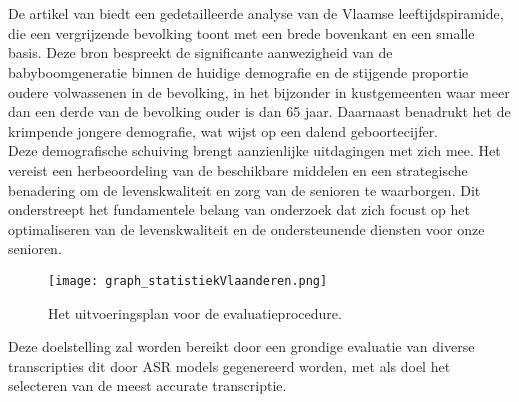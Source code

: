
\chapter{}%
\label{ch:inleiding}


De artikel van \textcite{StatistiekVlaanderen2023} biedt een gedetailleerde analyse van de Vlaamse leeftijdspiramide, die een vergrijzende bevolking toont met een brede bovenkant en een smalle basis. Deze bron bespreekt de significante aanwezigheid van de babyboomgeneratie binnen de huidige demografie en de stijgende proportie oudere volwassenen in de bevolking, in het bijzonder in kustgemeenten waar meer dan een derde van de bevolking ouder is dan 65 jaar. Daarnaast benadrukt het de krimpende jongere demografie, wat wijst op een dalend geboortecijfer. 
\\
Deze demografische schuiving brengt aanzienlijke uitdagingen met zich mee. Het vereist een herbeoordeling van de beschikbare middelen en een strategische benadering om de levenskwaliteit en zorg van de senioren te waarborgen. Dit onderstreept het fundamentele belang van onderzoek dat zich focust op het optimaliseren van de levenskwaliteit en de ondersteunende diensten voor onze senioren.
\begin{figure}[h]
    \centering
    \texttt{[image: graph\_statistiekVlaanderen.png]}
    \captionsetup{justification=centering}
    \caption{Het uitvoeringsplan voor de evaluatieprocedure.}
    \label{fig:plan_methodologie}
\end{figure}
\FloatBarrier

Deze doelstelling zal worden bereikt door een grondige evaluatie van diverse transcripties dit door ASR models gegenereerd worden, met als doel het selecteren van de meest accurate transcriptie.
